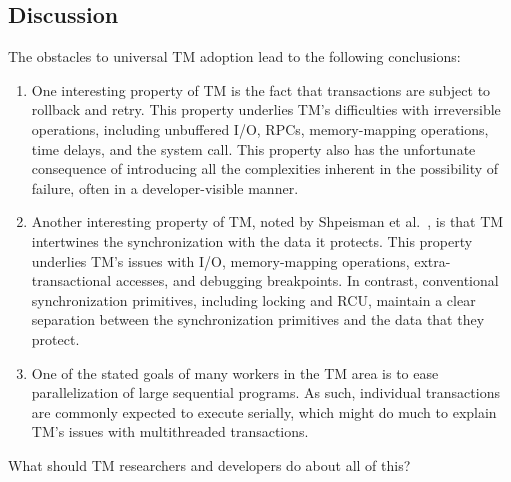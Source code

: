 \subsection{Discussion}
\label{sec:future:Discussion}

The obstacles to universal TM adoption lead to the following
conclusions:

\begin{enumerate}
\item	One interesting property of TM is the fact that transactions are
	subject to rollback and retry.
	This property underlies TM's difficulties with irreversible
	operations, including unbuffered I/O, RPCs, memory-mapping
	operations, time delays, and the  system call.
	This property also has the unfortunate consequence of introducing
	all the complexities inherent in the possibility of failure,
	often in a developer-visible manner.
\item	Another interesting property of TM, noted by
	Shpeisman et al.~\cite{TatianaShpeisman2009CppTM}, is that TM
	intertwines the synchronization with the data it protects.
	This property underlies TM's issues with I/O, memory-mapping
	operations, extra-transactional accesses, and debugging
	breakpoints.
	In contrast, conventional synchronization primitives, including
	locking and RCU, maintain a clear separation between the
	synchronization primitives and the data that they protect.
\item	One of the stated goals of many workers in the TM area is to
	ease parallelization of large sequential programs.
	As such, individual transactions are commonly expected to
	execute serially, which might do much to explain TM's issues
	with multithreaded transactions.
\end{enumerate}

\QuickQuizEnd

What should TM researchers and developers do about all of this?

